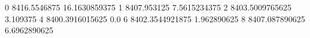 0 8416.5546875 16.1630859375
1 8407.953125 7.5615234375
2 8403.5009765625 3.109375
4 8400.3916015625 0.0
6 8402.3544921875 1.962890625
8 8407.087890625 6.6962890625
